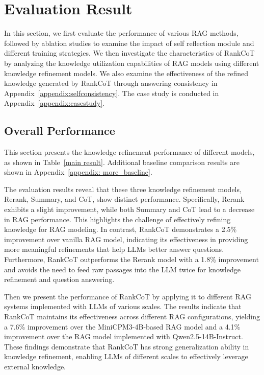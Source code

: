 
\section{Evaluation Result}
In this section, we first evaluate the performance of various RAG methods, followed by ablation studies to examine the impact of self reflection module and different training strategies. We then investigate the characteristics of RankCoT by analyzing the knowledge utilization capabilities of RAG models using different knowledge refinement models. We also examine the effectiveness of the refined knowledge generated by RankCoT through answering consistency in Appendix~\ref{appendix:selfconsistency}. The case study is conducted in Appendix~\ref{appendix:casestudy}.

\subsection{Overall Performance}
This section presents the knowledge refinement performance of different models, as shown in Table~\ref{main result}. Additional baseline comparison results are shown in Appendix~\ref{appendix: more_baseline}.

The evaluation results reveal that these three knowledge refinement models, Rerank, Summary, and CoT, show distinct performance. Specifically, Rerank exhibits a slight improvement, while both Summary and CoT lead to a decrease in RAG performance. This highlights the challenge of effectively refining knowledge for RAG modeling. In contrast, RankCoT demonstrates a 2.5\% improvement over vanilla RAG model, indicating its effectiveness in providing more meaningful refinements that help LLMs better answer questions. Furthermore, RankCoT outperforms the Rerank model with a 1.8\% improvement and avoids the need to feed raw passages into the LLM twice for knowledge refinement and question answering.

Then we present the performance of RankCoT by applying it to different RAG systems implemented with LLMs of various scales. The results indicate that RankCoT maintains its effectiveness across different RAG configurations, yielding a 7.6\% improvement over the MiniCPM3-4B-based RAG model and a 4.1\% improvement over the RAG model implemented with Qwen2.5-14B-Instruct. These findings demonstrate that RankCoT has strong generalization ability in knowledge refinement, enabling LLMs of different scales to effectively leverage external knowledge.



